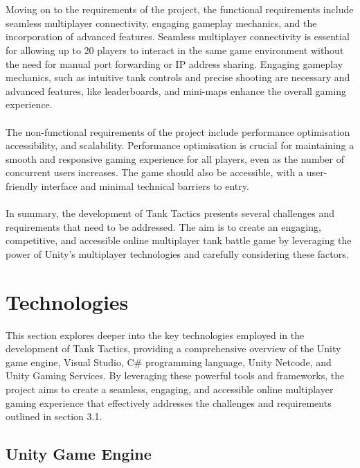 \\
\noindent
\\
Moving on to the requirements of the project, the functional requirements include seamless multiplayer connectivity, engaging gameplay mechanics, and the incorporation of advanced features. Seamless multiplayer connectivity is essential for allowing up to 20 players to interact in the same game environment without the need for manual port forwarding or IP address sharing. Engaging gameplay mechanics, such as intuitive tank controls and precise shooting are necessary and advanced features, like leaderboards, and mini-maps enhance the overall gaming experience.
\\
\noindent
\\
The non-functional requirements of the project include performance optimisation accessibility, and scalability. Performance optimisation is crucial for maintaining a smooth and responsive gaming experience for all players, even as the number of concurrent users increases. The game should also be accessible, with a user-friendly interface and minimal technical barriers to entry.
\\
\noindent
\\
In summary, the development of Tank Tactics presents several challenges and requirements that need to be addressed. The aim is to create an engaging, competitive, and accessible online multiplayer tank battle game by leveraging the power of Unity's multiplayer technologies and carefully considering these factors. 

\section{Technologies}
This section explores deeper into the key technologies employed in the development of Tank Tactics, providing a comprehensive overview of the Unity game engine, Visual Studio, C\# programming language, Unity Netcode, and Unity Gaming Services. By leveraging these powerful tools and frameworks, the project aims to create a seamless, engaging, and accessible online multiplayer gaming experience that effectively addresses the challenges and requirements outlined in section 3.1.

\subsection{Unity Game Engine}

